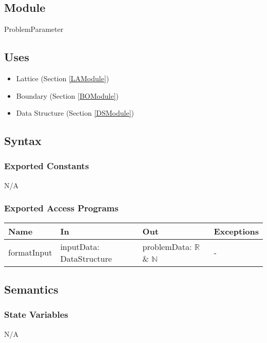 \documentclass[12pt, titlepage]{article}
\begin{document}
\subsection{Module}

ProblemParameter

\subsection{Uses}

\begin{itemize}
	\item Lattice (Section \ref{LAModule})
	\item Boundary (Section \ref{BOModule})
	\item Data Structure (Section \ref{DSModule})
\end{itemize}

\subsection{Syntax}

\subsubsection{Exported Constants}
N/A

\subsubsection{Exported Access Programs}

\begin{center}
	\begin{tabular}{p{2cm} p{3cm} p{4cm} p{2cm}}
		\hline
		\textbf{Name} & \textbf{In} & \textbf{Out} & \textbf{Exceptions} \\
		\hline
		formatInput & inputData: DataStructure & problemData: $\mathbb{R}$ \& $\mathbb{N}$ & - \\
		\hline
	\end{tabular}
\end{center}

\subsection{Semantics}

\subsubsection{State Variables}
N/A
\end{document}
